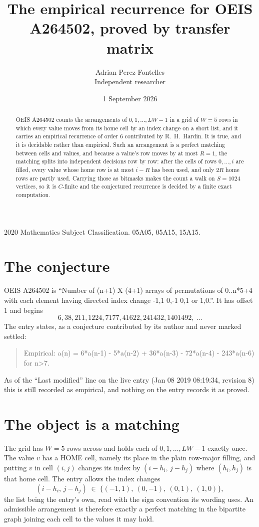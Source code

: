 \documentclass[11pt,a4paper]{article}
\title{The empirical recurrence for OEIS A264502, proved by transfer matrix}
\author{Adrian Perez Fontelles\\ \small Independent researcher}
\date{1 September 2026}
\theoremstyle{plain}
\theoremstyle{definition}
\begin{document}
\maketitle

\begin{abstract}
OEIS A264502 counts the arrangements of $0,1,\dots,LW-1$ in a grid of $W=5$ rows in which
every value moves from its home cell by an index change on a short list, and it carries an
empirical recurrence of order $6$ contributed by R.~H.~Hardin. It is true, and it is
decidable rather than empirical. Such an arrangement is a perfect matching between cells and
values, and because a value's row moves by at most $R=1$, the matching splits into
independent decisions row by row: after the cells of rows $0,\dots,i$ are filled,
every value whose home row is at most $i-R$ has been used, and only $2R$ home rows are
partly used. Carrying those as bitmasks makes the count a walk on $S=1024$ vertices, so it is
$C$-finite and the conjectured recurrence is decided by a finite exact computation.
\end{abstract}

\noindent\small 2020 Mathematics Subject Classification. 05A05, 05A15, 15A15.\normalsize

\section{The conjecture}

OEIS A264502 is ``Number of (n+1) X (4+1) arrays of permutations of 0..n*5+4 with each element having directed index change -1,1 0,-1 0,1 or 1,0.''. It has offset $1$ and begins
\[
6, 38, 211, 1224, 7177, 41622, 241432, 1401492,\ \dots
\]
The entry states, as a conjecture contributed by its author and never marked settled:
\begin{quote}
Empirical: a(n) = 6*a(n-1) - 5*a(n-2) + 36*a(n-3) - 72*a(n-4) - 243*a(n-6) for n>7.
\end{quote}
As of the ``Last modified'' line on the live entry (Jan 08 2019 08:19:34, revision 8) this is still
recorded as empirical, and nothing on the entry records it as proved.

\section{The object is a matching}

The grid has $W=5$ rows across and holds each of $0,1,\dots,LW-1$ exactly once. The value
$v$ has a HOME cell, namely its place in the plain row-major filling, and putting $v$ in cell
$(i,j)$ changes its index by $(i-h_i,\,j-h_j)$ where $(h_i,h_j)$ is that home cell. The entry
allows the index changes
\[
(i-h_i,\,j-h_j)\;\in\;\{(-1,1),\ (0,-1),\ (0,1),\ (1,0)\},
\]
the list being the entry's own, read with the sign convention its wording uses. An admissible
arrangement is therefore exactly a perfect matching in the bipartite graph joining each cell to
the values it may hold.
\end{document}
